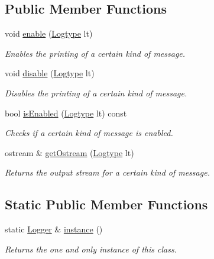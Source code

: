 \subsection*{Public Member Functions}
\begin{DoxyCompactItemize}
\item 
void \hyperlink{classLogger_a9ae40dbcf05113315595e387b2776d2e}{enable} (\hyperlink{classLogger_ac9e601f90bf326ce2088de52018861dc}{Logtype} lt)
\begin{DoxyCompactList}\small\item\em Enables the printing of a certain kind of message. \end{DoxyCompactList}\item 
void \hyperlink{classLogger_af314cd99569d9384d419be84b471941b}{disable} (\hyperlink{classLogger_ac9e601f90bf326ce2088de52018861dc}{Logtype} lt)
\begin{DoxyCompactList}\small\item\em Disables the printing of a certain kind of message. \end{DoxyCompactList}\item 
bool \hyperlink{classLogger_a4dd35dedf6e079909fea430eace0ca88}{is\-Enabled} (\hyperlink{classLogger_ac9e601f90bf326ce2088de52018861dc}{Logtype} lt) const 
\begin{DoxyCompactList}\small\item\em Checks if a certain kind of message is enabled. \end{DoxyCompactList}\item 
ostream \& \hyperlink{classLogger_ac1418f03089428bfb7f3805b7709f2cb}{get\-Ostream} (\hyperlink{classLogger_ac9e601f90bf326ce2088de52018861dc}{Logtype} lt)
\begin{DoxyCompactList}\small\item\em Returns the output stream for a certain kind of message. \end{DoxyCompactList}\end{DoxyCompactItemize}
\subsection*{Static Public Member Functions}
\begin{DoxyCompactItemize}
\item 
static \hyperlink{classLogger}{Logger} \& \hyperlink{classLogger_a4aa4d7c3b98f6e12e7ea8253da5ea0cd}{instance} ()
\begin{DoxyCompactList}\small\item\em Returns the one and only instance of this class. \end{DoxyCompactList}\end{DoxyCompactItemize}
